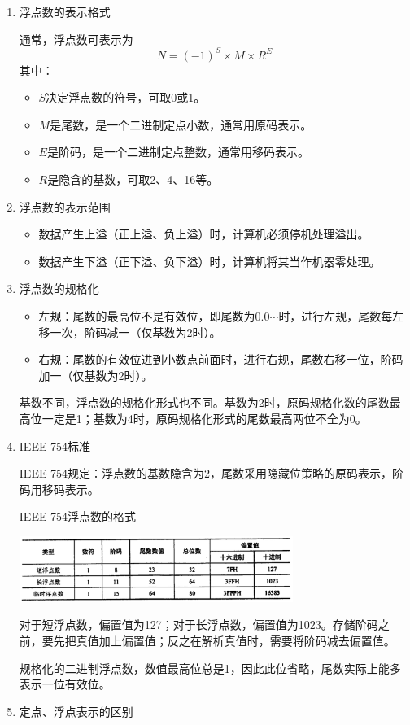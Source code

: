 \documentclass[12pt, a4paper, oneside]{ctexart}
\begin{document}
\begin{enumerate}
  \item {\kaishu 浮点数的表示格式}
  
  通常，浮点数可表示为
  \begin{equation*}
    N=(-1)^S\times M\times R^E
  \end{equation*}
  其中：
  \begin{itemize}
    \item $S$决定浮点数的符号，可取0或1。
    \item $M$是尾数，是一个二进制定点小数，通常用原码表示。
    \item $E$是阶码，是一个二进制定点整数，通常用移码表示。
    \item $R$是隐含的基数，可取2、4、16等。
  \end{itemize}
  \item {\kaishu 浮点数的表示范围}
  
  \begin{itemize}
    \item 数据产生上溢（正上溢、负上溢）时，计算机必须停机处理溢出。
    \item 数据产生下溢（正下溢、负下溢）时，计算机将其当作机器零处理。
  \end{itemize}
  \item {\kaishu 浮点数的规格化}
  
  \begin{itemize}
    \item 左规：尾数的最高位不是有效位，即尾数为$0.0\cdots$时，进行左规，尾数每左移一次，阶码减一（仅基数为2时）。
    \item 右规：尾数的有效位进到小数点前面时，进行右规，尾数右移一位，阶码加一（仅基数为2时）。
  \end{itemize}

  基数不同，浮点数的规格化形式也不同。基数为2时，原码规格化数的尾数最高位一定是1；基数为4时，原码规格化形式的尾数最高两位不全为0。
  \item {\kaishu IEEE 754标准}
  
  IEEE 754规定：浮点数的基数隐含为2，尾数采用隐藏位策略的原码表示，阶码用移码表示。
  \begin{table}
    \centering
    \caption{IEEE 754浮点数的格式}
    \includegraphics[width=0.7\textwidth]{./images/ieee754.png}
  \end{table}
  对于短浮点数，偏置值为127；对于长浮点数，偏置值为1023。存储阶码之前，要先把真值加上偏置值；反之在解析真值时，需要将阶码减去偏置值。

  规格化的二进制浮点数，数值最高位总是1，因此此位省略，尾数实际上能多表示一位有效位。
  \item {\kaishu 定点、浮点表示的区别}
\end{enumerate}
\end{document}
